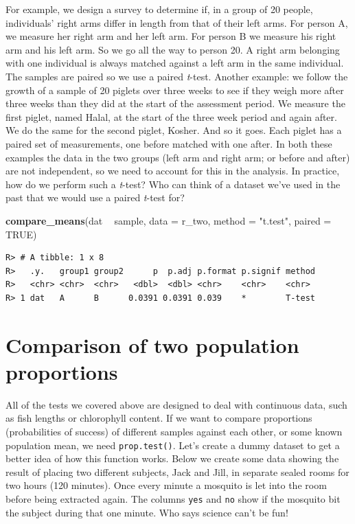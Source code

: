 \documentclass[english,10pt,a4paper,oneside]{book}
\newenvironment{Shaded}{\begin{snugshade}}{\end{snugshade}}
\newcommand{\DataTypeTok}[1]{\textcolor[rgb]{0.13,0.29,0.53}{#1}}
\newcommand{\KeywordTok}[1]{\textcolor[rgb]{0.13,0.29,0.53}{\textbf{#1}}}
\newcommand{\NormalTok}[1]{#1}
\newcommand{\OperatorTok}[1]{\textcolor[rgb]{0.81,0.36,0.00}{\textbf{#1}}}
\newcommand{\OtherTok}[1]{\textcolor[rgb]{0.56,0.35,0.01}{#1}}
\newcommand{\StringTok}[1]{\textcolor[rgb]{0.31,0.60,0.02}{#1}}
\theoremstyle{definition}
\theoremstyle{definition}
\theoremstyle{definition}
\theoremstyle{remark}
\begin{document}
For example, we design a survey to determine if, in a group of 20
people, individuals' right arms differ in length from that of their left
arms. For person A, we measure her right arm and her left arm. For
person B we measure his right arm and his left arm. So we go all the way
to person 20. A right arm belonging with one individual is always
matched against a left arm in the same individual. The samples are
paired so we use a paired \emph{t}-test. Another example: we follow the
growth of a sample of 20 piglets over three weeks to see if they weigh
more after three weeks than they did at the start of the assessment
period. We measure the first piglet, named Halal, at the start of the
three week period and again after. We do the same for the second piglet,
Kosher. And so it goes. Each piglet has a paired set of measurements,
one before matched with one after. In both these examples the data in
the two groups (left arm and right arm; or before and after) are not
independent, so we need to account for this in the analysis. In
practice, how do we perform such a \emph{t}-test? Who can think of a
dataset we've used in the past that we would use a paired \emph{t}-test
for?

\begin{Shaded}
\begin{Highlighting}[]
\KeywordTok{compare_means}\NormalTok{(dat }\OperatorTok{~}\StringTok{ }\NormalTok{sample, }\DataTypeTok{data =}\NormalTok{ r_two, }\DataTypeTok{method =} \StringTok{"t.test"}\NormalTok{, }\DataTypeTok{paired =} \OtherTok{TRUE}\NormalTok{)}
\end{Highlighting}
\end{Shaded}

\begin{verbatim}
R> # A tibble: 1 x 8
R>   .y.   group1 group2      p  p.adj p.format p.signif method
R>   <chr> <chr>  <chr>   <dbl>  <dbl> <chr>    <chr>    <chr> 
R> 1 dat   A      B      0.0391 0.0391 0.039    *        T-test
\end{verbatim}

\hypertarget{comparison-of-two-population-proportions}{%
\section{Comparison of two population
proportions}\label{comparison-of-two-population-proportions}}

All of the tests we covered above are designed to deal with continuous
data, such as fish lengths or chlorophyll content. If we want to compare
proportions (probabilities of success) of different samples against each
other, or some known population mean, we need \texttt{prop.test()}.
Let's create a dummy dataset to get a better idea of how this function
works. Below we create some data showing the result of placing two
different subjects, Jack and Jill, in separate sealed rooms for two
hours (120 minutes). Once every minute a mosquito is let into the room
before being extracted again. The columns \texttt{yes} and \texttt{no}
show if the mosquito bit the subject during that one minute. Who says
science can't be fun!
\end{document}
